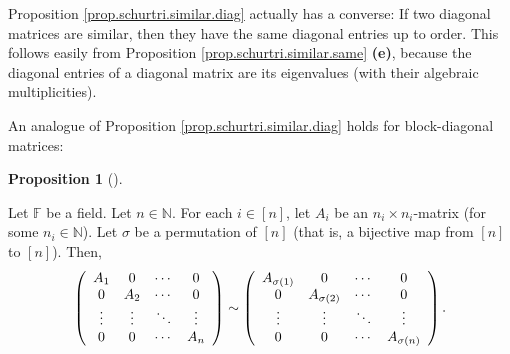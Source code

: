\documentclass[numbers=enddot,12pt,final,onecolumn,notitlepage]{scrartcl}%
\numberwithin{exer}{subsection}
\theoremstyle{definition}
\newtheorem{prop}[theo]{Proposition}
\newenvironment{proposition}[1][]
{\begin{prop}[#1]\begin{leftbar}}
{\end{leftbar}\end{prop}}
\begin{document}
Proposition \ref{prop.schurtri.similar.diag} actually has a converse: If two
diagonal matrices are similar, then they have the same diagonal entries up to
order. This follows easily from Proposition \ref{prop.schurtri.similar.same}
\textbf{(e)}, because the diagonal entries of a diagonal matrix are its
eigenvalues (with their algebraic multiplicities).

An analogue of Proposition \ref{prop.schurtri.similar.diag} holds for
block-diagonal matrices:

\begin{proposition}
\label{prop.schurtri.similar.block-diag}Let $\mathbb{F}$ be a field. Let
$n\in\mathbb{N}$. For each $i\in\left[  n\right]  $, let $A_{i}$ be an
$n_{i}\times n_{i}$-matrix (for some $n_{i}\in\mathbb{N}$). Let $\sigma$ be a
permutation of $\left[  n\right]  $ (that is, a bijective map from $\left[
n\right]  $ to $\left[  n\right]  $). Then,%
\[
\left(
\begin{array}
[c]{cccc}%
A_{1} & 0 & \cdots & 0\\
0 & A_{2} & \cdots & 0\\
\vdots & \vdots & \ddots & \vdots\\
0 & 0 & \cdots & A_{n}%
\end{array}
\right)  \sim\left(
\begin{array}
[c]{cccc}%
A_{\sigma\left(  1\right)  } & 0 & \cdots & 0\\
0 & A_{\sigma\left(  2\right)  } & \cdots & 0\\
\vdots & \vdots & \ddots & \vdots\\
0 & 0 & \cdots & A_{\sigma\left(  n\right)  }%
\end{array}
\right)  .
\]

\end{proposition}
\end{document}
